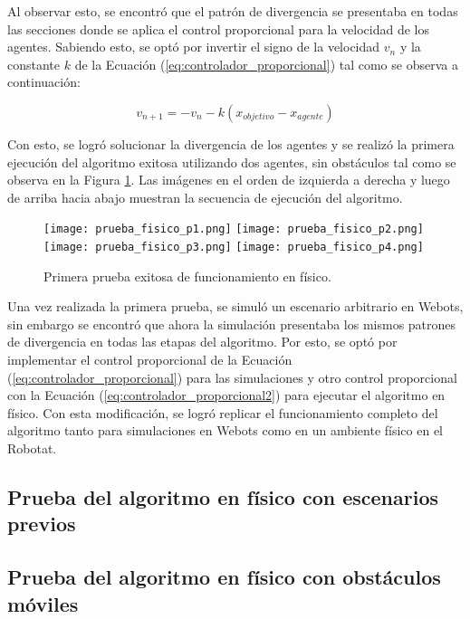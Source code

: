 Al observar esto, se encontró que el patrón de divergencia se presentaba en todas las secciones donde se aplica el control proporcional para la velocidad de los agentes. Sabiendo esto, se optó por invertir el signo de la velocidad $v_n$ y la constante $k$ de la Ecuación (\ref{eq:controlador_proporcional}) tal como se observa a continuación:

\begin{equation}
	v_{n+1} = -v_n - k(x_{objetivo} - x_{agente})
	\label{eq:controlador_proporcional2}
\end{equation}

Con esto, se logró solucionar la divergencia de los agentes y se realizó la primera ejecución del algoritmo exitosa utilizando dos agentes, sin obstáculos tal como se observa en la Figura \ref{fig:prueba_fisico1}. Las imágenes en el orden de izquierda a derecha y luego de arriba hacia abajo muestran la secuencia de ejecución del algoritmo.

\begin{figure}[H]
	\centering
	\texttt{[image: prueba\_fisico\_p1.png]}
	\texttt{[image: prueba\_fisico\_p2.png]}
	\texttt{[image: prueba\_fisico\_p3.png]}
	\texttt{[image: prueba\_fisico\_p4.png]}
	\caption{Primera prueba exitosa de funcionamiento en físico.}
	\label{fig:prueba_fisico1}
\end{figure}

Una vez realizada la primera prueba, se simuló un escenario arbitrario en Webots, sin embargo se encontró que ahora la simulación presentaba los mismos patrones de divergencia en todas las etapas del algoritmo. Por esto, se optó por implementar el control proporcional de la Ecuación (\ref{eq:controlador_proporcional}) para las simulaciones y otro control proporcional con la Ecuación (\ref{eq:controlador_proporcional2}) para ejecutar el algoritmo en físico. Con esta modificación, se logró replicar el funcionamiento completo del algoritmo tanto para simulaciones en Webots como en un ambiente físico en el Robotat.

\subsection{Prueba del algoritmo en físico con escenarios previos}

\subsection{Prueba del algoritmo en físico con obstáculos móviles}


